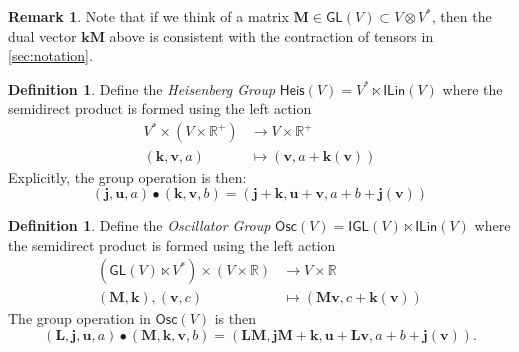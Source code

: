 \documentclass[12pt]{article}
\newcounter{counter}
\theoremstyle{definition}
\newtheorem{dfn}[counter]{Definition}
\newtheorem{rmk}[counter]{Remark}
\theoremstyle{plain}
\begin{document}
\begin{rmk}
    Note that if we think of a matrix $\mathbf{M}\in\mathsf{GL}(V)\subset V\otimes V^*$, then the dual vector $\mathbf{kM}$ above is consistent with the contraction of tensors in \autoref{sec:notation}.\\
\end{rmk}

\begin{dfn}
    Define the \emph{Heisenberg Group} \(\mathsf{Heis}(V) = V^* \ltimes \mathsf{ILin}(V)\) where the semidirect product is formed using the left action
    \begin{align}
        V^*\times (V\times\mathbb{R}^+) &\to V\times\mathbb{R}^+\\
        (\mathbf{k},\mathbf{v},a) &\mapsto (\mathbf{v},a+\mathbf{k}(\mathbf{v}))
    \end{align}
    Explicitly, the group operation is then:
    \begin{equation}
        (\mathbf{j},\mathbf{u},a)\bullet(\mathbf{k},\mathbf{v},b) = (\mathbf{j}+\mathbf{k},\mathbf{u}+\mathbf{v},a+b+\mathbf{j}(\mathbf{v}))
    \end{equation}
\end{dfn}

\begin{dfn} 
    Define the \emph{Oscillator Group} \(\mathsf{Osc}(V) = \mathsf{IGL}(V) \ltimes \mathsf{ILin}(V)\) where the semidirect product is formed using the left action
    \begin{align}
        (\mathsf{GL}(V) \ltimes V^*) \times (V \times \mathbb{R}) &\to V \times \mathbb{R} \\
        (\mathbf{M}, \mathbf{k}), (\mathbf{v}, c) &\mapsto (\mathbf{Mv}, c + \mathbf{k} (\mathbf{v}))
    \end{align}
    The group operation in $\mathsf{Osc}(V)$ is then
    \begin{equation}\label{eq:OscGpOper}
        (\mathbf{L}, \mathbf{j}, \mathbf{u}, a) 
        \bullet (\mathbf{M}, \mathbf{k}, \mathbf{v}, b)
        = (\mathbf{LM}, \mathbf{jM} + \mathbf{k}, \mathbf{u} + \mathbf{Lv}, a + b + \mathbf{j} (\mathbf{v})).
    \end{equation}
\end{dfn}
\end{document}
